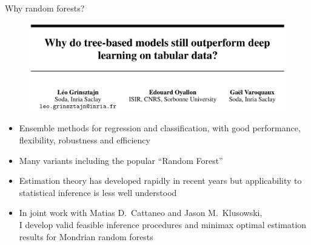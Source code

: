 \documentclass{beamer}
\begin{document}
\begin{frame}{Why random forests?}

  \vspace*{3mm}
  \begin{figure}[ht]
    \centering
    \includegraphics[scale=0.1]{graphics/forest_nn_paper.png}
  \end{figure}
  \vspace*{-1mm}

  \begin{itemize}

    \item Ensemble methods
      for regression and classification,
      with good performance, flexibility, robustness and efficiency
      \nocite{breiman2001random}
      \nocite{cutler2001pert}
      \nocite{breiman2004consistency}
      \nocite{geurts2006extremely}
      \nocite{menze2011oblique}
      \nocite{lakshminarayanan2014mondrian}

    \item
      Many variants including the popular ``Random Forest''

    \item
      Estimation theory has developed rapidly
      in recent years but
      applicability to statistical inference
      is less well understood

    \item
      In joint work with Matias D.\ Cattaneo and Jason M.\ Klusowski, \\
      I develop \alert{valid feasible inference} procedures
      and \alert{minimax optimal estimation} results
      for Mondrian random forests

  \end{itemize}

\end{frame}
\end{document}
